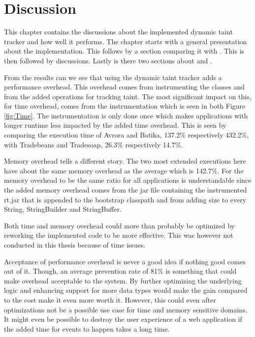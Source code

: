 \chapter{Discussion}


This chapter contains the discussions about the implemented dynamic taint tracker and how well it performs. The chapter starts with a general presentation about the implementation. This follows by a section comparing it with \textit{}. This is then followed by \textit{} discussions. Lastly is there two sections about \textit{} and \textit{}.

From the results can we see that using the dynamic taint tracker adds a performance overhead. This overhead comes from instrumenting the classes and from the added operations for tracking taint. The most significant impact on this, for time overhead, comes from the instrumentation which is seen in both Figure \ref{fig:Time}. The instrumentation is only done once which makes applications with longer runtime less impacted by the added time overhead. This is seen by comparing the execution time of Avrora and Batika, 137.2\% respectively 432.2\%, with Tradebeans and Tradesoap, 26.3\% respectively 14.7\%.

Memory overhead tells a different story. The two most extended executions here have about the same memory overhead as the average which is 142.7\%. For the memory overhead to be the same ratio for all applications is understandable since the added memory overhead comes from the jar file containing the instrumented rt.jar that is appended to the bootstrap classpath and from adding size to every String, StringBuilder and StringBuffer.

Both time and memory overhead could more than probably be optimized by reworking the implemented code to be more effective. This was however not conducted in this thesis because of time issues.

Acceptance of performance overhead is never a good idea if nothing good comes out of it. Though, an average prevention rate of 81\% is something that could make overhead acceptable to the system. By further optimizing the underlying logic and enhancing support for more data types would make the gain compared to the cost make it even more worth it. However, this could even after optimizations not be a possible use case for time and memory sensitive domains. It might even be possible to destroy the user experience of a web application if the added time for events to happen takes a long time.



